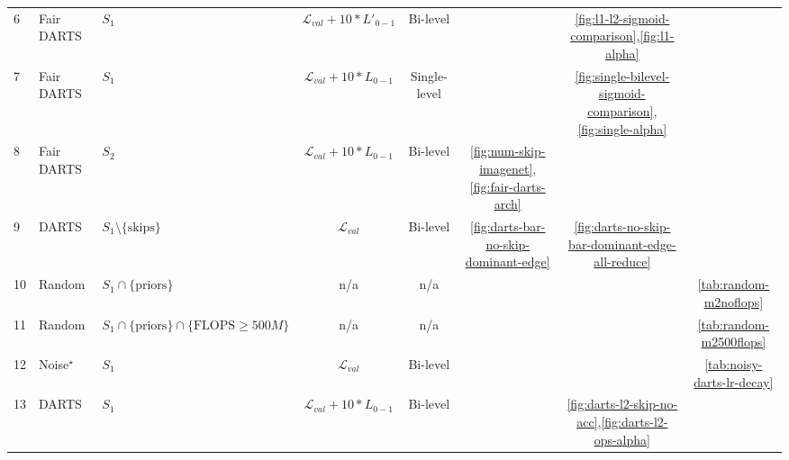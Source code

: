 \documentclass[runningheads]{llncs}
\begin{document}
\begin{table*}
\begin{center}
{{\begin{tabular}{llp{3cm}*{5}{c}}
					6 & Fair DARTS & $S_1$ & $\mathcal{L}_{val} + 10 * L'_{0-1}$ & Bi-level &  & \ref{fig:l1-l2-sigmoid-comparison},\ref{fig:l1-alpha}  &\\
					7 & Fair DARTS & $S_1$ & $\mathcal{L}_{val} + 10*L_{0-1}$ & Single-level & & \ref{fig:single-bilevel-sigmoid-comparison},\ref{fig:single-alpha}&\\
					8 & Fair DARTS & $S_2$ & $\mathcal{L}_{val} + 10*L_{0-1}$ & Bi-level & \ref{fig:num-skip-imagenet},\ref{fig:fair-darts-arch} && \\
					9 & DARTS & $S_1 \setminus \{\text{skips}\}$ &  $\mathcal{L}_{val}$ & Bi-level &\ref{fig:darts-bar-no-skip-dominant-edge} & \ref{fig:darts-no-skip-bar-dominant-edge-all-reduce}& \\
					10 & Random & $S_1 \cap \{\text{priors}\}$ & n/a & n/a & & & \ref{tab:random-m2noflops} \\
					11 & Random & $S_1 \cap \{\text{priors}\} \cap \{\text{FLOPS} \geq 500M\}$ & n/a & n/a & && \ref{tab:random-m2500flops} \\
					12 & Noise$^\star$ & $S_1 $ &  $\mathcal{L}_{val}$ & Bi-level & && \ref{tab:noisy-darts-lr-decay} \\
					13 & DARTS & $S_1$ & $\mathcal{L}_{val} + 10*L_{0-1}$ & Bi-level & & \ref{fig:darts-l2-skip-no-acc},\ref{fig:darts-l2-ops-alpha}& \\
					\hline
		\end{tabular}}}
	\end{center}
\end{table*}
\end{document}
